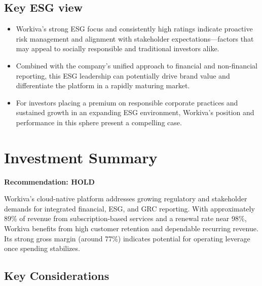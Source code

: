 \documentclass[
  10pt,
  a4paper,
]{article}
\providecommand{\tightlist}{%
  \setlength{\itemsep}{0pt}\setlength{\parskip}{0pt}}\usepackage{longtable,booktabs,array}
\begin{document}
\subsection{Key ESG view}\label{key-esg-view}

\begin{itemize}
\tightlist
\item
  Workiva's strong ESG focus and consistently high ratings indicate
  proactive risk management and alignment with stakeholder
  expectations---factors that may appeal to socially responsible and
  traditional investors alike.
\item
  Combined with the company's unified approach to financial and
  non-financial reporting, this ESG leadership can potentially drive
  brand value and differentiate the platform in a rapidly maturing
  market.
\item
  For investors placing a premium on responsible corporate practices and
  sustained growth in an expanding ESG environment, Workiva's position
  and performance in this sphere present a compelling case.
\end{itemize}

\section{Investment Summary}\label{investment-summary}

\textbf{Recommendation: HOLD}

Workiva's cloud-native platform addresses growing regulatory and
stakeholder demands for integrated financial, ESG, and GRC reporting.
With approximately 89\% of revenue from subscription-based services and
a renewal rate near 98\%, Workiva benefits from high customer retention
and dependable recurring revenue. Its strong gross margin (around 77\%)
indicates potential for operating leverage once spending stabilizes.

\subsection{Key Considerations}\label{key-considerations}
\end{document}
